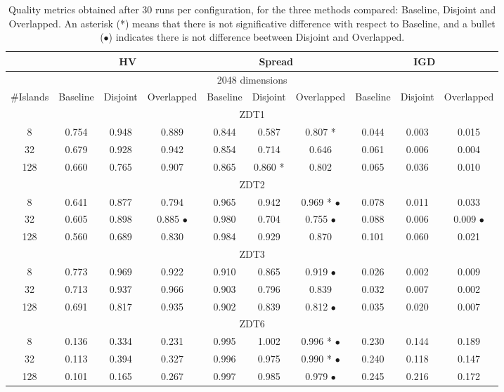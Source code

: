 \documentclass[runningheads,a4paper]{llncs}
\begin{document}
\begin{table}
{\begin{tabular}{|c||c|c|c||c|c|c||c|c|c||}
																												
																												
																												
																												
	&	\multicolumn{3}{|c|}{HV}								&	\multicolumn{3}{|c|}{Spread}								&	\multicolumn{3}{|c|}{IGD}								\\ \hline
\multicolumn{10}{|c|}{2048 dimensions}																												\\ \hline
\#Islands	&	Baseline	&	Disjoint	&		Overlapped			&	Baseline	&	Disjoint		&	Overlapped			&	Baseline	&	Disjoint		&	Overlapped			\\ \hline
\multicolumn{10}{|c|}{ZDT1}																												\\ \hline
8	&	0.754	&	0.948	&		0.889			&	0.844	&	0.587		&	0.807	*		&	0.044	&	0.003		&	0.015			\\
32	&	0.679	&	0.928	&		0.942			&	0.854	&	0.714		&	0.646			&	0.061	&	0.006		&	0.004			\\
128	&	0.660	&	0.765	&		0.907			&	0.865	&	0.860	*	&	0.802			&	0.065	&	0.036		&	0.010			\\ \hline
\multicolumn{10}{|c|}{ZDT2}																												\\ \hline
8	&	0.641	&	0.877	&		0.794			&	0.965	&	0.942		&	0.969	*	$\bullet$	&	0.078	&	0.011		&	0.033			\\
32	&	0.605	&	0.898	&		0.885		$\bullet$	&	0.980	&	0.704		&	0.755		$\bullet$	&	0.088	&	0.006		&	0.009		$\bullet$	\\
128	&	0.560	&	0.689	&		0.830			&	0.984	&	0.929		&	0.870			&	0.101	&	0.060		&	0.021			\\ \hline
\multicolumn{10}{|c|}{ZDT3}																												\\ \hline
8	&	0.773	&	0.969	&		0.922			&	0.910	&	0.865		&	0.919		$\bullet$	&	0.026	&	0.002		&	0.009			\\
32	&	0.713	&	0.937	&		0.966			&	0.903	&	0.796		&	0.839			&	0.032	&	0.007		&	0.002			\\
128	&	0.691	&	0.817	&		0.935			&	0.902	&	0.839		&	0.812		$\bullet$	&	0.035	&	0.020		&	0.007			\\ \hline
\multicolumn{10}{|c|}{ZDT6}																												\\ \hline
8	&	0.136	&	0.334	&		0.231			&	0.995	&	1.002		&	0.996	*	$\bullet$	&	0.230	&	0.144		&	0.189			\\
32	&	0.113	&	0.394	&		0.327			&	0.996	&	0.975		&	0.990	*	$\bullet$	&	0.240	&	0.118		&	0.147			\\
128	&	0.101	&	0.165	&		0.267			&	0.997	&	0.985		&	0.979		$\bullet$	&	0.245	&	0.216		&	0.172			\\ \hline


\end{tabular}
}
\caption{Quality metrics obtained after 30 runs per configuration, for the three methods compared: Baseline, Disjoint  and Overlapped. An asterisk (*) means that there is not significative difference with respect to Baseline, and a bullet ($\bullet$) indicates there is not difference beetween Disjoint and Overlapped.}
\label{tab:results}
\end{table}
\end{document}
